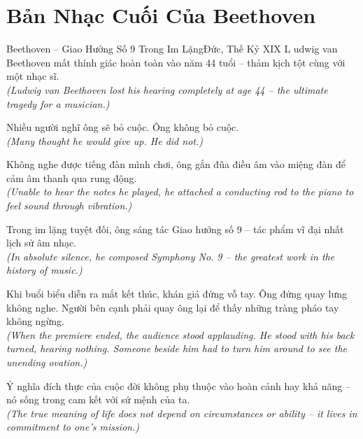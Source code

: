 \section{Bản Nhạc Cuối Của Beethoven}
\begin{truyen}{Beethoven -- Giao Hưởng Số 9 Trong Im Lặng}{Đức, Thế Kỷ XIX}
L udwig van Beethoven mất thính giác hoàn toàn vào năm 44 tuổi -- thảm kịch tột cùng với một nhạc sĩ.\\
\textit{(Ludwig van Beethoven lost his hearing completely at age 44 -- the ultimate tragedy for a musician.)}

Nhiều người nghĩ ông sẽ bỏ cuộc. Ông không bỏ cuộc.\\
\textit{(Many thought he would give up. He did not.)}

Không nghe được tiếng đàn mình chơi, ông gắn đũa điều âm vào miệng đàn để cảm âm thanh qua rung động.\\
\textit{(Unable to hear the notes he played, he attached a conducting rod to the piano to feel sound through vibration.)}

Trong im lặng tuyệt đối, ông sáng tác Giao hưởng số 9 -- tác phẩm vĩ đại nhất lịch sử âm nhạc.\\
\textit{(In absolute silence, he composed Symphony No. 9 -- the greatest work in the history of music.)}

Khi buổi biểu diễn ra mắt kết thúc, khán giả đứng vỗ tay. Ông đứng quay lưng không nghe. Người bên cạnh phải quay ông lại để thấy những tràng pháo tay không ngừng.\\
\textit{(When the premiere ended, the audience stood applauding. He stood with his back turned, hearing nothing. Someone beside him had to turn him around to see the unending ovation.)}

\end{truyen}
\begin{baihoc}
  Ý nghĩa đích thực của cuộc đời không phụ thuộc vào hoàn cảnh hay khả năng -- nó sống trong cam kết với sứ mệnh của ta.\\
  \textit{(The true meaning of life does not depend on circumstances or ability -- it lives in commitment to one's mission.)}
\end{baihoc}

